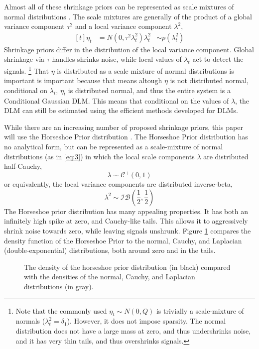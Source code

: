 \documentclass{article}
\newcommand{\dist}[1]{\mathcal{#1}}
\newcommand{\paren}[1]{\ensuremath{\left(#1\right)}}
\newcommand{\dhalfcauchy}[1]{\ensuremath{\dist{C}^{+}\paren{#1}}}
\newcommand{\dinvbeta}[1]{\ensuremath{\dist{IB}\paren{#1}}}
\begin{document}
Almost all of these shrinkage priors can be represented as scale mixtures of normal distributions \parencite{PolsonScott2010}.
The scale mixtures are generally of the product of a global variance component $\tau^{2}$ and a local variance component $\lambda^{2}$,
\begin{equation}
  \label{eq:3}
  \begin{aligned}[t]
    \eta_{t} &= N(0, \tau^{2} \lambda_{t}^{2})
    \lambda_{t}^{2} &\sim p(\lambda_{t}^{2})
  \end{aligned}
\end{equation}
Shrinkage priors differ in the distribution of the local variance component.%
Global shrinkage via $\tau$ handles shrinks noise, while local values of $\lambda_{t}$ act to detect the signals.\parencite[5]{PolsonScott2010}
\footnote{
Note that the commonly used $\eta_{t} \sim N(0, Q)$ is trivially a scale-mixture of normals ($\lambda_{t}^{2} = \delta_{1}$).
However, it does not impose sparsity. 
The normal distribution does not have a large mass at zero, and thus undershrinks noise, and it has very thin tails, and thus overshrinks signals.
}
That $\eta$ is distributed as a scale mixture of normal distributions is important is important because that means altough $\eta$ is not distributed normal, conditional on $\lambda_{t}$, $\eta_{t}$ is distributed normal, and thus the entire system is a Conditional Gaussian DLM.
This means that conditional on the values of $\lambda$, the DLM can still be estimated using the efficient methods developed for DLMs.

While there are an increasing number of proposed shrinkage priors, this paper will use the Horseshoe Prior distribution \parencites{CarvalhoPolsonScott2009}{CarvalhoPolsonScott2010}{PolsonScott2010}{PolsonScott2012}{DattaGhosh2012}.
The Horseshoe Prior distribution has no analytical form, but can be represented as a scale-mixture of normal distributions (as in \eqref{eq:3}) in which the local scale components $\lambda$ are distributed half-Cauchy,
\begin{equation}
  \label{eq:6}
  \lambda \sim \dhalfcauchy{0, 1}
\end{equation}
or equivalently, the local variance components are distributed inverse-beta,
\begin{equation}
  \label{eq:9}
  \lambda^{2} \sim \dinvbeta{\frac{1}{2}, \frac{1}{2}}
\end{equation}
The Horseshoe prior distribution has many appealing properties.
It has both an infinitely high spike at zero, and Cauchy-like tails.
This allows it to aggressively shrink noise towards zero, while leaving signals unshrunk.
Figure \ref{fig:horseshoe} compares the density function of the Horseshoe Prior to the normal, Cauchy, and Laplacian (double-exponential) distributions, both around zero and in the tails.
\begin{figure}
  \centering
  \caption{The density of the horseshoe prior distribution (in black) compared with the densities of the normal, Cauchy, and Laplacian distributions (in gray).}
  \label{fig:horseshoe}
\end{figure}
\end{document}
